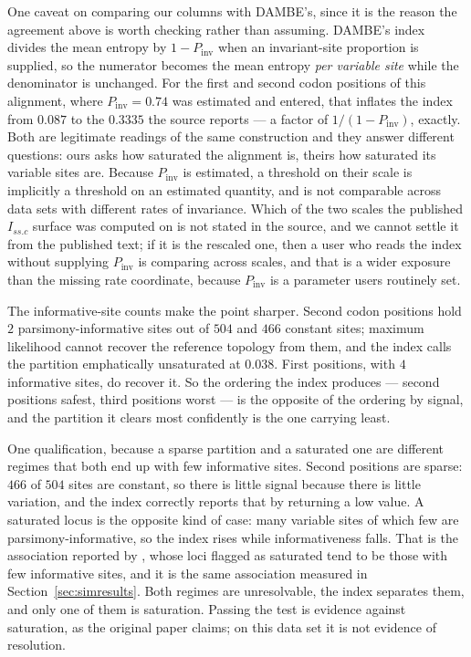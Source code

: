 \documentclass[preprint,12pt,authoryear]{elsarticle}
\newcommand{\Issc}{I_{ss.c}}
\theoremstyle{definition}
\theoremstyle{remark}
\begin{document}
One caveat on comparing our columns with DAMBE's, since it is the reason the
agreement above is worth checking rather than assuming. DAMBE's index divides
the mean entropy by $1-P_{\mathrm{inv}}$ when an invariant-site proportion is
supplied, so the numerator becomes the mean entropy \emph{per variable site}
while the denominator is unchanged. For the first and second codon positions
of this alignment, where $P_{\mathrm{inv}}=0.74$ was estimated and entered,
that inflates the index from $0.087$ to the $0.3335$ the source reports --- a
factor of $1/(1-P_{\mathrm{inv}})$, exactly. Both are legitimate readings of
the same construction and they answer different questions: ours asks how
saturated the alignment is, theirs how saturated its variable sites are.
Because $P_{\mathrm{inv}}$ is estimated, a threshold on their scale is
implicitly a threshold on an estimated quantity, and is not comparable across
data sets with different rates of invariance. Which of the two scales the
published $\Issc$ surface was computed on is not stated in the source, and we
cannot settle it from the published text; if it is the rescaled one, then a
user who reads the index without supplying $P_{\mathrm{inv}}$ is comparing
across scales, and that is a wider exposure than the missing rate coordinate,
because $P_{\mathrm{inv}}$ is a parameter users routinely set.

The informative-site counts make the point sharper. Second codon positions
hold $2$ parsimony-informative sites out of $504$ and $466$ constant sites;
maximum likelihood cannot recover the reference topology from them, and the
index calls the partition emphatically unsaturated at $0.038$. First
positions, with $4$ informative sites, do recover it. So the ordering the
index produces --- second positions safest, third positions worst --- is the
opposite of the ordering by signal, and the partition it clears most
confidently is the one carrying least.

One qualification, because a sparse partition and a saturated one are
different regimes that both end up with few informative sites. Second
positions are sparse: $466$ of $504$ sites are constant, so there is little
signal because there is little variation, and the index correctly reports
that by returning a low value. A saturated locus is the opposite kind of
case: many variable sites of which few are parsimony-informative, so the
index rises while informativeness falls. That is the association reported by
\citet{duchene2022saturation}, whose loci flagged as saturated tend to be
those with few informative sites, and it is the same association measured in
Section~\ref{sec:simresults}. Both regimes are unresolvable, the index
separates them, and only one of them is saturation. Passing the test is evidence against
saturation, as the original paper claims; on this data set it is not evidence
of resolution.
\end{document}
